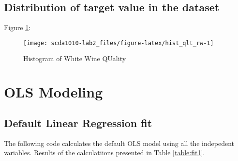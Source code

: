 \hypertarget{distribution-of-target-value-in-the-dataset}{%
\subsection{Distribution of target value in the
dataset}\label{distribution-of-target-value-in-the-dataset}}

Figure \ref{fig:hist_qlt_rw}:

\begin{Schunk}
\begin{figure}[h]

{\centering \texttt{[image: scda1010-lab2\_files/figure-latex/hist\_qlt\_rw-1]} 

}

\caption[Histogram of White Wine QUality]{Histogram of White Wine QUality}\label{fig:hist_qlt_rw}
\end{figure}
\end{Schunk}

\hypertarget{ols-modeling}{%
\section{OLS Modeling}\label{ols-modeling}}

\hypertarget{default-linear-regression-fit}{%
\subsection{Default Linear Regression
fit}\label{default-linear-regression-fit}}

The following code calculates the default OLS model using all the
indepedent variables. Results of the calculatiions presented in Table
\ref{table:fit1}.

